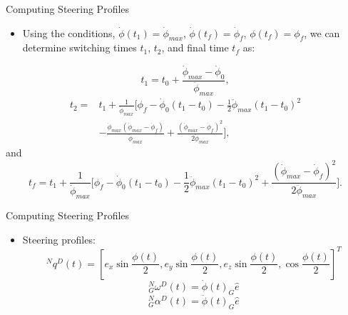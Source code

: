 \documentclass{beamer}
\begin{document}
%
%
\begin{frame}{Computing Steering Profiles}

\begin{block}{ }
\begin{itemize}
\item Using the conditions, $\dot{\phi}(t_1)=\dot{\phi}_{max}$, $\dot{\phi}(t_f)=\dot{\phi}_f$, $\phi(t_f)=\phi_f$, we can determine switching times $t_1$, $t_2$, and final time $t_f$ as:
\end{itemize}
 \begin{equation}\label{t1cons}
t_1=t_0+\frac{\dot{\phi}_{max}-\dot{\phi}_0}{\ddot{\phi}_{max}},
 \end{equation}
 \begin{equation}\label{t2cons}
 \begin{split}
 t_2=&t_1+\frac{1}{\dot{\phi}_{max}}\Big[ \phi_f-\dot{\phi}_0(t_1-t_0)-\frac{1}{2}\ddot{\phi}_{max}(t_1-t_0)^2\\
 &-\frac{\dot{\phi}_{max}(\dot{\phi}_{max}-\dot{\phi}_f)}{\ddot{\phi}_{max}}+\frac{(\dot{\phi}_{max}-\dot{\phi}_f)^2}{2\ddot{\phi}_{max}} \Big],
 \end{split}
 \end{equation}
and
  \begin{equation}\label{tfcons}
 t_f=t_1+\frac{1}{\dot{\phi}_{max}}\Big[ \phi_f-\dot{\phi}_0(t_1-t_0)-\frac{1}{2}\ddot{\phi}_{max}(t_1-t_0)^2+\frac{(\dot{\phi}_{max}-\dot{\phi}_f)^2}{2\ddot{\phi}_{max}} \Big].
 \end{equation}
\end{block}
\end{frame}

\begin{frame}{Computing Steering Profiles}

\begin{block}{ }
\begin{itemize}
\item Steering profiles:
\begin{equation}
^Nq^D(t)=[e_x\sin\frac{\phi(t)}{2}, e_y\sin\frac{\phi(t)}{2}, e_z\sin\frac{\phi(t)}{2}, \cos\frac{\phi(t)}{2}]^T
\end{equation}
\begin{equation}
^N_G\omega^D(t)=\dot{\phi}(t)_G\hat{e}
\end{equation}
\begin{equation}
^N_G\alpha^D(t)=\ddot{\phi}(t)_G\hat{e}
\end{equation}
\end{itemize}
\end{block}
\end{frame}
\end{document}

